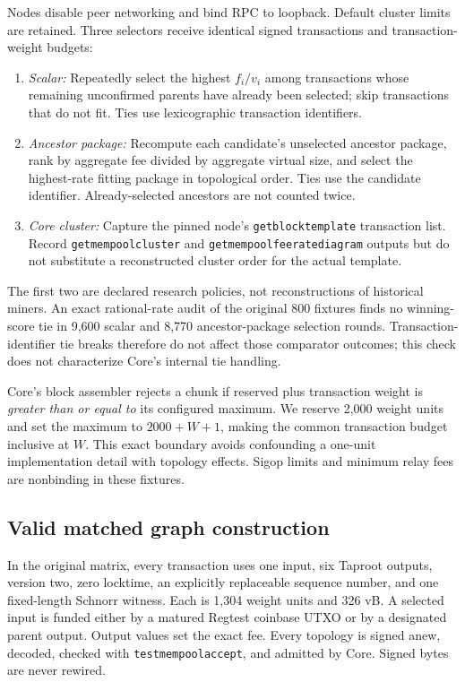 \documentclass[conference]{IEEEtran}
\begin{document}
Nodes disable peer networking and bind RPC to loopback. Default cluster limits are retained. Three selectors receive identical signed transactions and transaction-weight budgets:
\begin{enumerate}
\item \emph{Scalar:} Repeatedly select the highest $f_i/v_i$ among transactions whose remaining unconfirmed parents have already been selected; skip transactions that do not fit. Ties use lexicographic transaction identifiers.
\item \emph{Ancestor package:} Recompute each candidate's unselected ancestor package, rank by aggregate fee divided by aggregate virtual size, and select the highest-rate fitting package in topological order. Ties use the candidate identifier. Already-selected ancestors are not counted twice.
\item \emph{Core cluster:} Capture the pinned node's \texttt{getblocktemplate} transaction list. Record \texttt{getmempoolcluster} and \texttt{getmempoolfeeratediagram} outputs but do not substitute a reconstructed cluster order for the actual template.
\end{enumerate}
The first two are declared research policies, not reconstructions of historical miners. An exact rational-rate audit of the original 800 fixtures finds no winning-score tie in 9,600 scalar and 8,770 ancestor-package selection rounds. Transaction-identifier tie breaks therefore do not affect those comparator outcomes; this check does not characterize Core's internal tie handling.

Core's block assembler rejects a chunk if reserved plus transaction weight is \emph{greater than or equal to} its configured maximum. We reserve 2,000 weight units and set the maximum to $2000+W+1$, making the common transaction budget inclusive at $W$. This exact boundary avoids confounding a one-unit implementation detail with topology effects. Sigop limits and minimum relay fees are nonbinding in these fixtures.

\subsection{Valid matched graph construction}
In the original matrix, every transaction uses one input, six Taproot outputs, version two, zero locktime, an explicitly replaceable sequence number, and one fixed-length Schnorr witness. Each is 1,304 weight units and 326 vB. A selected input is funded either by a matured Regtest coinbase UTXO or by a designated parent output. Output values set the exact fee. Every topology is signed anew, decoded, checked with \texttt{testmempoolaccept}, and admitted by Core. Signed bytes are never rewired.
\end{document}
